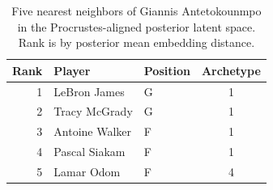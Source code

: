 \begin{table}[htbp]
  \centering\small
  \begin{tabular}{rllc}
    \toprule
    Rank & Player & Position & Archetype \\
    \midrule
    1 & LeBron James & G & 1 \\
    2 & Tracy McGrady & G & 1 \\
    3 & Antoine Walker & F & 1 \\
    4 & Pascal Siakam & F & 1 \\
    5 & Lamar Odom & F & 4 \\
    \bottomrule
  \end{tabular}
  \caption{Five nearest neighbors of Giannis Antetokounmpo in the Procrustes-aligned posterior latent space. Rank is by posterior mean embedding distance.}
  \label{tab:Giannis_Antetokounmpo_neighbors}
\end{table}


